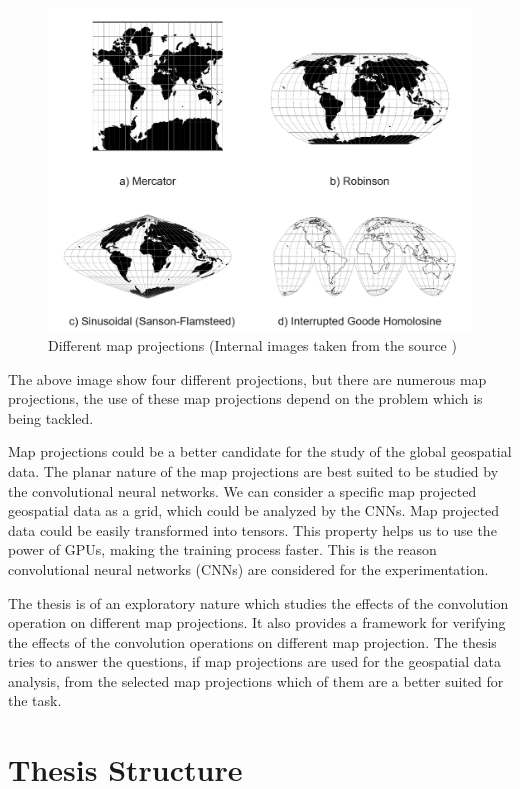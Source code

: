 \begin{figure}[h]
    \centering
    \includegraphics[width=1.0\linewidth]{figures/chapter-1/multi_projections.png}
    \caption{Different map projections (Internal images taken from the source \cite{PROJ_SITE}) }
    \label{fig:multiple-projections}
\end{figure}

The above image show four different projections, but there are numerous map projections, the use of these map projections depend on the problem which is being tackled.

Map projections could be a better candidate for the study of the global geospatial data. The planar nature of the map projections are best suited to be studied by the convolutional neural networks. We can consider a specific map projected geospatial data as a grid, which could be analyzed by the CNNs.
Map projected data could be easily transformed into tensors. This property helps us to use the power of GPUs, making the training process faster. This is the reason convolutional neural networks (CNNs) are considered for the experimentation.

The thesis is of an exploratory nature which studies the effects of the convolution operation on different map projections. It also provides a framework for verifying the effects of the convolution operations on different map projection.
The thesis tries to answer the questions, if map projections are used for the geospatial data analysis, from the selected map projections which of them are a better suited for the task.

\section{Thesis Structure}

